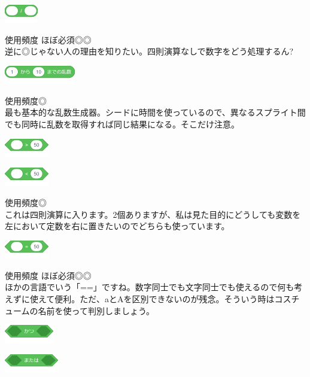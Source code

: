 \documentclass[b5paper,10pt]{jsarticle}
\begin{document}
\begin{multicols*}{3}
\begin{itembox}{1}
\includegraphics[height=8mm]{images/operators_4.png}
\end{itembox}
使用頻度 ほぼ必須◎◎\\
逆に◎じゃない人の理由を知りたい。四則演算なしで数字をどう処理するん?
\begin{itembox}{2}
\includegraphics[height=8mm]{images/operators_5.png}
\end{itembox}
使用頻度◎\\
最も基本的な乱数生成器。シードに時間を使っているので、異なるスプライト間でも同時に乱数を取得すれば同じ結果になる。そこだけ注意。
\begin{itembox}{3}
\includegraphics[height=8mm]{images/operators_6.png}

\includegraphics[height=8mm]{images/operators_7.png}
\end{itembox}
使用頻度◎\\
これは四則演算に入ります。2個ありますが、私は見た目的にどうしても変数を左において定数を右に置きたいのでどちらも使っています。
\begin{itembox}{4}
\includegraphics[height=8mm]{images/operators_8.png}
\end{itembox}
使用頻度 ほぼ必須◎◎\\
ほかの言語でいう「==」ですね。数字同士でも文字同士でも使えるので何も考えずに使えて便利。ただ、aとAを区別できないのが残念。そういう時はコスチュームの名前を使って判別しましょう。
\begin{itembox}{5}
\includegraphics[height=8mm]{images/operators_9.png}

\includegraphics[height=8mm]{images/operators_10.png}


\end{itembox}
\end{multicols*}
\end{document}
